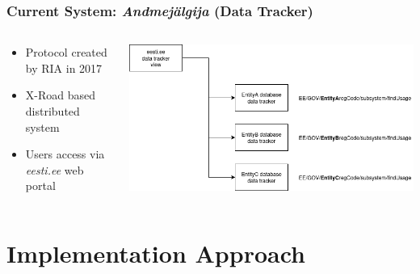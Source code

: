 \documentclass[aspectratio=169,11pt]{beamer}
\begin{document}
\begin{frame}
\frametitle{Current System: \textit{Andmejälgija} (Data Tracker)}
\begin{columns}
\begin{column}{0.3\textwidth}
\begin{itemize}
    \item Protocol created by RIA in 2017
    \item X-Road based distributed system
    \item Users access via \textit{eesti.ee} web portal
\end{itemize}
\end{column}
\begin{column}{0.7\textwidth}
\begin{center}
\includegraphics[width=\textwidth]{../english/figures/aj_model.PNG}
\end{center}
\end{column}
\end{columns}
\end{frame}

\section{Implementation Approach}
\end{document}
